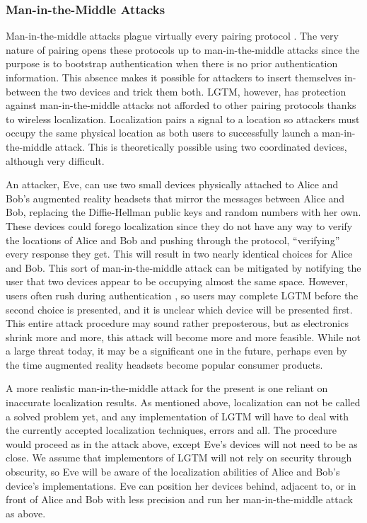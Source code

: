\documentclass[12pt]{report}
\begin{document}
\subsubsection{Man-in-the-Middle Attacks}
Man-in-the-middle attacks plague virtually every pairing protocol \cite{ConferenceCompStudySecurePairingKumar2009}. The very nature of pairing opens these protocols up to man-in-the-middle attacks since the purpose is to bootstrap authentication when there is no prior authentication information. This absence makes it possible for attackers to insert themselves in-between the two devices and trick them both. LGTM, however, has protection against man-in-the-middle attacks not afforded to other pairing protocols thanks to wireless localization. Localization pairs a signal to a location so attackers must occupy the same physical location as both users to successfully launch a man-in-the-middle attack. This is theoretically possible using two coordinated devices, although very difficult. \par

An attacker, Eve, can use two small devices physically attached to Alice and Bob's augmented reality headsets that mirror the messages between Alice and Bob, replacing the Diffie-Hellman public keys and random numbers with her own. These devices could forego localization since they do not have any way to verify the locations of Alice and Bob and pushing through the protocol, ``verifying'' every response they get. This will result in two nearly identical choices for Alice and Bob. This sort of man-in-the-middle attack can be mitigated by notifying the user that two devices appear to be occupying almost the same space. However, users often rush during authentication \cite{PairingInterfaceConstrainedRushingSaxena2009}, so users may complete LGTM before the second choice is presented, and it is unclear which device will be presented first. This entire attack procedure may sound rather preposterous, but as electronics shrink more and more, this attack will become more and more feasible. While not a large threat today, it may be a significant one in the future, perhaps even by the time augmented reality headsets become popular consumer products. \par

A more realistic man-in-the-middle attack for the present is one reliant on inaccurate localization results. As mentioned above, localization can not be called a solved problem yet, and any implementation of LGTM will have to deal with the currently accepted localization techniques, errors and all. The procedure would proceed as in the attack above, except Eve's devices will not need to be as close. We assume that implementors of LGTM will not rely on security through obscurity, so Eve will be aware of the localization abilities of Alice and Bob's device's implementations. Eve can position her devices behind, adjacent to, or in front of Alice and Bob with less precision and run her man-in-the-middle attack as above. \par
\end{document}
